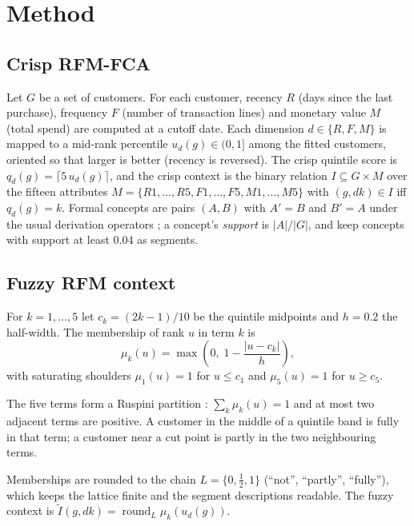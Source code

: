 \section{Method}\label{sec:method}

\subsection{Crisp RFM-FCA}\label{sec:crisp}

Let $G$ be a set of customers. For each customer, recency $R$ (days since the last purchase), frequency $F$ (number of transaction lines) and monetary value $M$ (total spend) are computed at a cutoff date. Each dimension $d \in \{R,F,M\}$ is mapped to a mid-rank percentile $u_d(g) \in (0,1]$ among the fitted customers, oriented so that larger is better (recency is reversed). The crisp quintile score is $q_d(g) = \lceil 5\,u_d(g) \rceil$, and the crisp context is the binary relation $I \subseteq G \times M$ over the fifteen attributes $M = \{R1,\dots,R5,F1,\dots,F5,M1,\dots,M5\}$ with $(g, dk) \in I$ iff $q_d(g) = k$. Formal concepts are pairs $(A,B)$ with $A' = B$ and $B' = A$ under the usual derivation operators \citep{ganter1999}; a concept's \emph{support} is $|A|/|G|$, and \citet{rungruang2024} keep concepts with support at least $0.04$ as segments.

\subsection{Fuzzy RFM context}\label{sec:fuzzy-context}

\begin{definition}
For $k=1,\dots,5$ let $c_k = (2k-1)/10$ be the quintile midpoints and $h = 0.2$ the half-width. The membership of rank $u$ in term $k$ is
\begin{equation}
\mu_k(u) = \max\!\left(0,\; 1 - \frac{|u - c_k|}{h}\right),
\end{equation}
with saturating shoulders $\mu_1(u) = 1$ for $u \le c_1$ and $\mu_5(u) = 1$ for $u \ge c_5$.
\end{definition}

The five terms form a Ruspini partition \citep{ruspini1969}: $\sum_k \mu_k(u) = 1$ and at most two adjacent terms are positive. A customer in the middle of a quintile band is fully in that term; a customer near a cut point is partly in the two neighbouring terms.

Memberships are rounded to the chain $L = \{0, \tfrac12, 1\}$ (``not'', ``partly'', ``fully''), which keeps the lattice finite and the segment descriptions readable. The fuzzy context is $\tilde I(g, dk) = \operatorname{round}_L \mu_k(u_d(g))$.

